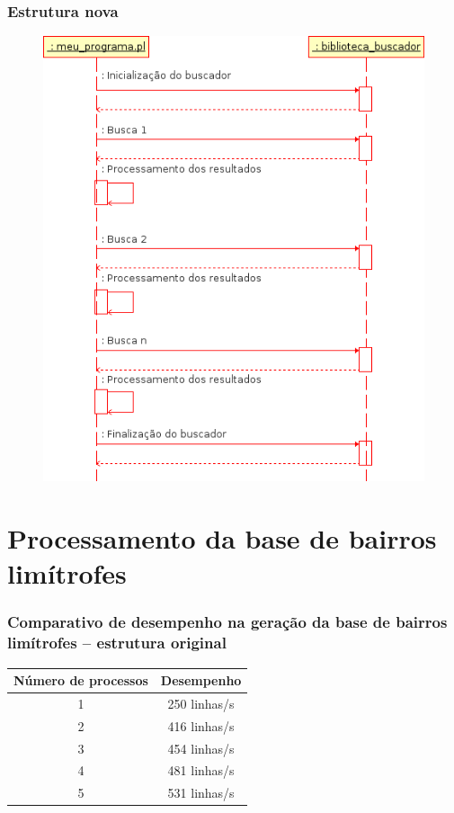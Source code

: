\documentclass{beamer}
\begin{document}
\frame
{
  \frametitle{Estrutura nova}

  \begin{figure}[h]
    \centering
    \includegraphics [scale=0.33]{novo.png}
  \end{figure}
}

\section{Processamento da base de bairros lim\'itrofes}

\frame
{
  \frametitle{Comparativo de desempenho na gera\c{c}\~ao da base de bairros lim\'itrofes -- estrutura original}

  \begin{center}
    \begin{tabular}{c|c}
      \hline
      N\'umero de processos & Desempenho\\
      \hline
      1 & 250 linhas/s\\
      2 & 416 linhas/s\\
      3 & 454 linhas/s\\
      4 & 481 linhas/s\\
      5 & 531 linhas/s\\
      \hline      
    \end{tabular}
  \end{center}
}
\end{document}
